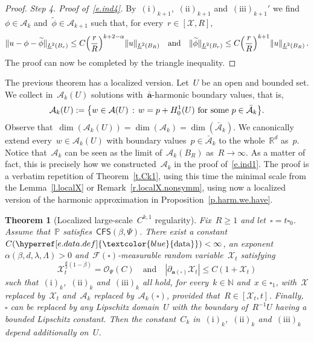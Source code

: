 \documentclass[11pt,twoside]{article} %
\let\oldsquare\square %
\renewcommand{\square}{\oldsquare}
\numberwithin{equation}{section}
\newtheorem{theorem}{Theorem}[section]
\theoremstyle{definition}
\newcommand{\dataref}{\hyperref[e.data.def]{\textcolor{blue}{\ensuremath{\mathrm{data}}}}}
\let\originalleft\left
\let\originalright\right
\renewcommand{\left}{\mathopen{}\mathclose\bgroup\originalleft}
\renewcommand{\right}{\aftergroup\egroup\originalright}
\newcommand*{\N}{\ensuremath{\mathbb{N}}}
\newcommand*{\R}{\ensuremath{\mathbb{R}}}
\renewcommand*{\tilde}{\widetilde}
\newcommand{\qand}{\quad \mbox{and} \quad }
\renewcommand{\a}{\mathbf{a}}
\newcommand{\ahom}{\bar{\a}}
\newcommand{\cu}{\square}
\newcommand{\F}{\mathcal{F}}
\renewcommand{\P}{\mathbb{P}}
\newcommand{\X}{\mathcal{X}}
\renewcommand{\O}{\mathcal{O}}
\newcommand{\CFS}{\mathsf{CFS}}
\newcommand{\A}{\mathcal{A}}
\newcommand{\Ahom}{\bar{\A}}
\begin{document}
\begin{proof}
\smallskip

\emph{Step 4. Proof of~\eqref{e.ind4}.} By~$\mathrm{(i)}_{k+1}$,~$\mathrm{(ii)}_{k+1}$ and~$\mathrm{(iii)}_{k+1}'$ we find~$\phi \in \A_k$ and~$\tilde \phi \in \A_{k+1}$ such that, for every~$r \in [\X,R]$, 
\begin{equation*}  
\| u - \phi - \tilde \phi \|_{\underline{L}^2(B_{r})} 
\leq 
C 
\Bigl( \frac{r}{R} \Bigr)^{k+2-\alpha} 
\| u \|_{\underline{L}^2(B_{R})} 
\quad \mbox{and} \quad 
\| \tilde \phi \|_{\underline{L}^2(B_{r})} 
\leq 
C \left( \frac{r}{R} \right)^{k+1} 
\| u \|_{\underline{L}^2(B_{R})} 
\,.
\end{equation*}
The proof can now be completed by the triangle inequality. 
\end{proof}

The previous theorem has a localized version. Let~$U$ be an open and bounded set.  We collect in~$\A_k (U)$ solutions with~$\ahom$-harmonic boundary values, that is, 
\begin{equation}
\label{e.localAk}
\A_k (U) := \left\{ w \in \A(U) \, : \, w = p + H_0^1(U)  \mbox{ for some } p\in \Ahom_k \right\}.
\end{equation}
Observe that~$\dim(\A_k(U)) = \dim(\A_k)  = \dim(\Ahom_k)$. We canonically extend every~$w\in \A_k (U)$ with boundary values~$p\in \Ahom_k$ to the whole~$\R^d$ as~$p$. 
Notice that~$\A_k$ can be seen as the limit of~$\A_k (B_R)$ as~$R\to \infty$. As a matter of fact, this is precisely how we constructed~$\A_k$ in the proof of~\eqref{e.ind1}. The proof is a verbatim repetition of Theorem~\ref{t.Ck1}, using this time the minimal scale from the Lemma~\ref{l.localX} or Remark~\ref{r.localX.nonsymm}, using now a localized version of the harmonic approximation in Proposition~\ref{p.harm.we.have}. 

\begin{theorem}[{Localized large-scale~$C^{k,1}$ regularity}]
\label{t.Ck1.local}
Fix~$R \geq 1$ and let~$\cu = t \cu_0$. Assume that~$\P$ satisfies~$\CFS(\beta,\Psi)$. 
There exist a constant~$C(\dataref)<\infty$, an exponent~$\alpha(\beta,d,\lambda,\Lambda)>0$ and~$\F(\cu)$-measurable random variable~$\X_t$ satisfying
\begin{equation}
\label{e.X.local}
\X_t^{\frac d2(1-\beta)  } 
= 
\O_{\Psi}(C) 
\qand 
|\partial_{\a(\cu)} \X_t |
\leq C(1+\X_t) 
\end{equation}
such that~$\mathrm{(i)}_k$,~$\mathrm{(ii)}_k$ and~$\mathrm{(iii)}_k$ all hold, for every~$k\in\N$ and~$x \in \cu_1$, with~$\X$ replaced by~$\X_t$ and~$\A_k$ replaced by~$\A_k (\cu)$, provided that~$R \in [\X_t,t]$. Finally,~$\cu$ can be replaced by any Lipschitz domain~$U$ with the boundary of~$R^{-1} U$ having a bounded Lipschitz constant. Then the constant~$C_k$ in~$\mathrm{(i)}_k$,~$\mathrm{(ii)}_k$ and~$\mathrm{(iii)}_k$ depend additionally on~$U$. 
\end{theorem}
\end{document}
